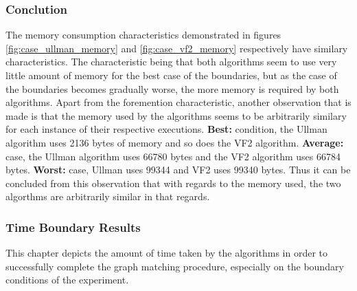 \subsubsection{Conclution}
The memory consumption characteristics demonstrated in figures \ref{fig:case_ullman_memory} and \ref{fig:case_vf2_memory} respectively have similary 
characteristics. The characteristic being that both algorithms seem to use very little amount of memory for the best case of the boundaries, but as the
case of the boundaries becomes gradually worse, the more memory is required by both algorithms.\newline\newline
Apart from the foremention characteristic, another observation that is made is that the memory used by the algorithms seems to be arbitrarily similary 
for each instance of their respective executions. \newline\newline
\textbf{Best:} condition, the Ullman algorithm uses 2136 bytes of memory and so does the VF2 algorithm.\newline\newline
\textbf{Average:} case, the Ullman algorithm uses 66780 bytes and the VF2 algorithm uses 66784 bytes.\newline\newline 
\textbf{Worst:} case, Ullman uses 99344 and VF2 uses 99340 bytes. Thus it can be concluded from this observation that with regards to the memory used, the two algorthms are arbitrarily similar in
that regards.

\subsubsection{Time Boundary Results}
\label{Time Boundary Results}
This chapter depicts the amount of time taken by the algorithms in order to successfully complete the graph matching procedure, especially on the 
boundary conditions of the experiment.

